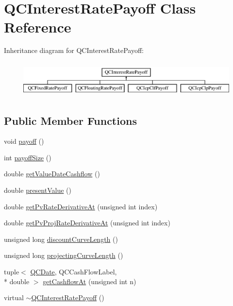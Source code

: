 \hypertarget{class_q_c_interest_rate_payoff}{\section{Q\+C\+Interest\+Rate\+Payoff Class Reference}
\label{class_q_c_interest_rate_payoff}
}
Inheritance diagram for Q\+C\+Interest\+Rate\+Payoff\+:\begin{figure}[H]
\begin{center}
\leavevmode
\includegraphics[height=1.917808cm]{class_q_c_interest_rate_payoff}
\end{center}
\end{figure}
\subsection*{Public Member Functions}
\begin{DoxyCompactItemize}
\item 
void \hyperlink{class_q_c_interest_rate_payoff_a3e218905ae425cad5283b438d338becc}{payoff} ()
\item 
int \hyperlink{class_q_c_interest_rate_payoff_a9277006372cd491323a9e4dce6d3cb85}{payoff\+Size} ()
\item 
double \hyperlink{class_q_c_interest_rate_payoff_a07a3040226a9996e4e77b4a39e3dbb31}{get\+Value\+Date\+Cashflow} ()
\item 
double \hyperlink{class_q_c_interest_rate_payoff_aa1fa4acff91e83dfb2174a4067c0231f}{present\+Value} ()
\item 
double \hyperlink{class_q_c_interest_rate_payoff_a1f1b38019791d59e4fd4053652da72a4}{get\+Pv\+Rate\+Derivative\+At} (unsigned int index)
\item 
double \hyperlink{class_q_c_interest_rate_payoff_a4c6072e011a2a05bcf45b2dbdfe33d56}{get\+Pv\+Proj\+Rate\+Derivative\+At} (unsigned int index)
\item 
unsigned long \hyperlink{class_q_c_interest_rate_payoff_ab2b6f0b4059cd77feb33d8d153a6366c}{discount\+Curve\+Length} ()
\item 
unsigned long \hyperlink{class_q_c_interest_rate_payoff_a15936bf1fd9af7d442393efc681e4f63}{projecting\+Curve\+Length} ()
\item 
tuple$<$ \hyperlink{class_q_c_date}{Q\+C\+Date}, Q\+C\+Cash\+Flow\+Label, \\*
double $>$ \hyperlink{class_q_c_interest_rate_payoff_a5c696c809dddf2c442f2aa25cfe7b55d}{get\+Cashflow\+At} (unsigned int n)
\item 
virtual \hyperlink{class_q_c_interest_rate_payoff_ae446121666d1b9b0573322977a2a907a}{$\sim$\+Q\+C\+Interest\+Rate\+Payoff} ()
\end{DoxyCompactItemize}
